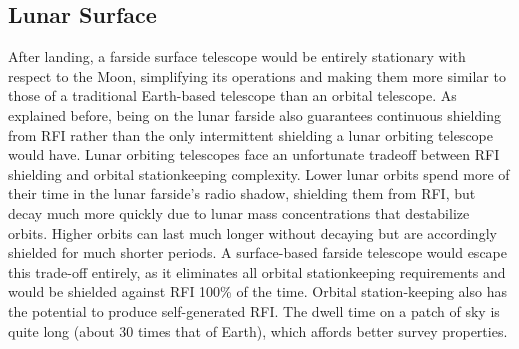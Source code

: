 \subsection{Lunar Surface}
After landing, a farside surface telescope would be entirely stationary with respect to the Moon, simplifying its operations and making them more similar to those of a traditional Earth-based telescope than an orbital telescope.  As explained before, being on the lunar farside also guarantees continuous shielding from RFI rather than the only intermittent shielding a lunar orbiting telescope would have.  Lunar orbiting telescopes face an unfortunate tradeoff between RFI shielding and orbital stationkeeping complexity. Lower lunar orbits spend more of their time in the lunar farside's radio shadow, shielding them from RFI, but decay much more quickly due to lunar mass concentrations that destabilize orbits. Higher orbits can last much longer without decaying but are accordingly shielded for much shorter periods.  A surface-based farside telescope would escape this trade-off entirely, as it eliminates all orbital stationkeeping requirements and would be shielded against RFI 100\% of the time.  Orbital station-keeping also has the potential to produce self-generated RFI.  The dwell time on a patch of sky is quite long (about 30 times that of Earth), which affords better survey properties.

